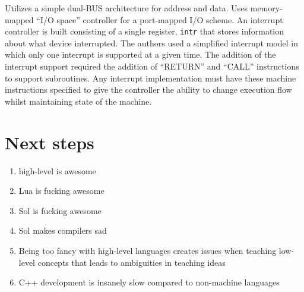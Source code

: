 Utilizes a simple dual-BUS architecture for address and data. Uses memory-mapped ``I/O space'' controller for a port-mapped I/O scheme. An interrupt controller is built consisting of a single register, \verb|intr| that stores information about what device interrupted. The authors used a simplified interrupt model in which only one interrupt is supported at a given time. The addition of the interrupt support required the addition of ``RETURN'' and ``CALL'' instructions to support subroutines. Any interrupt implementation must have these machine instructions specified to give the controller the ability to change execution flow whilst maintaining state of the machine. 

\section{Next steps}

\begin{enumerate}
    \item high-level is awesome
    \item Lua is fucking awesome
    \item Sol is fucking awesome
    \item Sol makes compilers sad
    \item Being too fancy with high-level languages creates issues when teaching low-level concepts that leads to ambiguities in teaching ideas
    \item C++ development is insanely slow compared to non-machine languages
\end{enumerate}